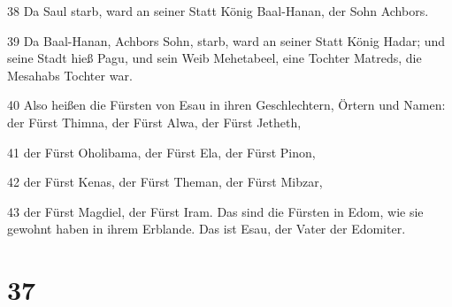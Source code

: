 \par 38 Da Saul starb, ward an seiner Statt König Baal-Hanan, der Sohn Achbors.
\par 39 Da Baal-Hanan, Achbors Sohn, starb, ward an seiner Statt König Hadar; und seine Stadt hieß Pagu, und sein Weib Mehetabeel, eine Tochter Matreds, die Mesahabs Tochter war.
\par 40 Also heißen die Fürsten von Esau in ihren Geschlechtern, Örtern und Namen: der Fürst Thimna, der Fürst Alwa, der Fürst Jetheth,
\par 41 der Fürst Oholibama, der Fürst Ela, der Fürst Pinon,
\par 42 der Fürst Kenas, der Fürst Theman, der Fürst Mibzar,
\par 43 der Fürst Magdiel, der Fürst Iram. Das sind die Fürsten in Edom, wie sie gewohnt haben in ihrem Erblande. Das ist Esau, der Vater der Edomiter.

\chapter{37}

